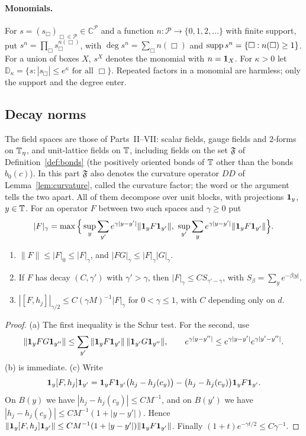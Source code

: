 \paragraph{Monomials.} For $s=(s_\Box)_{\Box\in\mathcal P}\in\mathbb C^{\mathcal P}$ and a function $n:\mathcal P\to\{0,1,2,\dots\}$ with finite support, put $s^n=\prod_\Box s_\Box^{n(\Box)}$, with $\deg s^n=\sum_\Box n(\Box)$ and $\operatorname{supp} s^n=\{\Box:n(\Box)\ge1\}$. For a union of boxes $X$, $s^X$ denotes the monomial with $n=\mathbf 1_X$. For $\kappa>0$ let $\mathbb D_\kappa=\{s:|s_\Box|\le e^\kappa\text{ for all }\Box\}$. Repeated factors in a monomial are harmless; only the support and the degree enter.

\subsection{Decay norms}\label{ss:40.1}

The field spaces are those of Parts~II--VII: scalar fields, gauge fields and $2$-forms on $\mathbb T_\eta$, and unit-lattice fields on $\mathbb T$, including fields on the set $\mathfrak F$ of Definition~\ref{def:bonds} (the positively oriented bonds of $\mathbb T$ other than the bonds $b_0(c)$). In this part $\mathfrak F$ also denotes the curvature operator $DD$ of Lemma~\ref{lem:curvature}, called the curvature factor; the word or the argument tells the two apart. All of them decompose over unit blocks, with projections $\mathbf 1_y$, $y\in\mathbb T$. For an operator $F$ between two such spaces and $\gamma\ge0$ put
\[
|F|_\gamma=\max\Big\{\sup_y\sum_{y'}e^{\gamma|y-y'|}\|\one_yF\one_{y'}\|,\ \sup_{y'}\sum_ye^{\gamma|y-y'|}\|\one_yF\one_{y'}\|\Big\}.
\]

\begin{lemma}\label{lem:decay-norm}
\begin{enumerate}[label=(\alph*)]
\item $\|F\|\le|F|_0\le|F|_\gamma$, and $|FG|_\gamma\le|F|_\gamma|G|_\gamma$.
\item If $F$ has decay $(C,\gamma')$ with $\gamma'>\gamma$, then $|F|_\gamma\le CS_{\gamma'-\gamma}$, with $S_\beta=\sum_ye^{-\beta|y|}$.
\item $|[F,h_j]|_{\gamma/2}\le C(\gamma M)^{-1}|F|_\gamma$ for $0<\gamma\le1$, with $C$ depending only on $d$.
\end{enumerate}
\end{lemma}

\begin{proof}
(a) The first inequality is the Schur test. For the second, use
\[
\|\mathbf 1_yFG\mathbf 1_{y''}\|\le\sum_{y'}\|\mathbf 1_yF\mathbf 1_{y'}\|\,\|\mathbf 1_{y'}G\mathbf 1_{y''}\|,\qquad e^{\gamma|y-y''|}\le e^{\gamma|y-y'|}e^{\gamma|y'-y''|}.
\] (b) is immediate. (c) Write
\[
\mathbf 1_y[F,h_j]\mathbf 1_{y'}=\mathbf 1_yF\mathbf 1_{y'}\big(h_j-h_j(c_y)\big)-\big(h_j-h_j(c_y)\big)\mathbf 1_yF\mathbf 1_{y'} .
\]
On $B(y)$ we have $|h_j-h_j(c_y)|\le CM^{-1}$, and on $B(y')$ we have $|h_j-h_j(c_y)|\le CM^{-1}(1+|y-y'|)$. Hence $\|\mathbf 1_y[F,h_j]\mathbf 1_{y'}\|\le CM^{-1}(1+|y-y'|)\|\mathbf 1_yF\mathbf 1_{y'}\|$. Finally $(1+t)e^{-\gamma t/2}\le C\gamma^{-1}$.
\end{proof}


